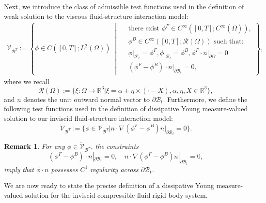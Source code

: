 \documentclass[11pt,twoside,reqno]{amsart}
\numberwithin{equation}{section}
\numberwithin{figure}{section}
\newtheorem{remark}{Remark}[section]
\begin{document}
Next, we introduce the class of admissible test functions used in the definition of weak solution to the viscous fluid-structure interaction model:
\begin{equation}\label{eq:DefofTestFunction}
    \begin{aligned}
 \mathcal{V}_{\mathcal{B}^T} :=\left\{
\phi \in C([0,T]; L^2(\Omega)) \; \middle|\; 
\begin{aligned}
&\text{there exist } \phi^F \in C^\infty([0,T]; C^\infty(\overline{\Omega})),\\& 
\phi^B \in C^\infty([0,T]; \mathcal{R}(\Omega)) \text{ such that:~} \\& \phi\big|_{\mathcal{F}_t} = \phi^F, 
\phi\big|_{ \mathcal{B}_t} = \phi^B, \phi^F \cdot n \big|_{\partial \Omega}= 0 \\
& (\phi^F-\phi^B) \cdot n\big|_{\partial \mathcal{B}_t} = 0,
\end{aligned}
\right\},
    \end{aligned}
\end{equation}
where we recall
\[
\mathcal{R}(\Omega) := \{\xi:\Omega\to \mathbb{R}^3 \big| \xi=\alpha+\eta\times(\cdot-X), \alpha,\eta,X\in \mathbb{R}^3 \},
\]
and $n$ denotes the unit outward normal vector to $\partial \mathcal{B}_t$. Furthermore, we define the following test functions used in the definition of dissipative Young measure-valued solution to our inviscid fluid-structure interaction model:
\begin{equation}
    \tilde{\mathcal{V}}_{\mathcal{B}^T}:=\{\phi\in \mathcal{V}_{\mathcal{B}^T}\big| n\cdot\nabla(\phi^F-\phi^B)n\big|_{\partial \mathcal{B}_t}=0\}.
\end{equation} 

\begin{remark}
For any $\phi \in \tilde{\mathcal{V}}_{\mathcal{B}^T}$, the constraints 
\[
(\phi^F - \phi^B)\cdot n|_{\partial\mathcal{B}_t} = 0, \quad
n \cdot \nabla(\phi^F - \phi^B)n|_{\partial\mathcal{B}_t} = 0,
\]
imply that $\phi \cdot n$ possesses $C^1$ regularity across $\partial\mathcal{B}_t$.
\end{remark}

We are now ready to state the precise definition of a dissipative Young measure-valued solution for the inviscid compressible fluid-rigid body system.
\end{document}
